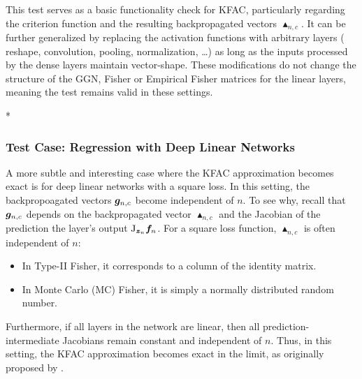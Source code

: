This test serves as a basic functionality check for KFAC, particularly regarding the criterion function and the resulting backpropagated vectors $\blacktriangle_{n,c}$.
It can be further generalized by replacing the activation functions with arbitrary layers (\eg\,reshape, convolution, pooling, normalization, \dots) as long as the inputs processed by the dense layers maintain vector-shape.
These modifications do not change the structure of the GGN, Fisher or Empirical Fisher matrices for the linear layers, meaning the test remains valid in these settings.


\switchcolumn[1]*
\switchcolumn[0]

\subsubsection{Test Case: Regression with Deep Linear Networks}

A more subtle and interesting case where the KFAC approximation becomes exact is for deep linear networks with a square loss.
In this setting, the backpropoagated vectors ${\bm{g}}_{n,c}$ become independent of $n$.
To see why, recall that ${\bm{g}}_{n,c}$ depends on the backpropagated vector $\blacktriangle_{n,c}$ and the Jacobian of the prediction \wrt the layer's output $\mathrm{J}_{{\bm{z}}_n} {\bm{f}}_n$.
For a square loss function, $\blacktriangle_{n,c}$ is often independent of $n$:
\begin{itemize}
\item In Type-II Fisher, it corresponds to a column of the identity matrix.
\item In Monte Carlo (MC) Fisher, it is simply a normally distributed random number.
\end{itemize}
Furthermore, if all layers in the network are linear, then all prediction-intermediate Jacobians remain constant and independent of $n$.
Thus, in this setting, the KFAC approximation becomes exact in the limit, as originally proposed by \cite{bernacchia2018exact}.

